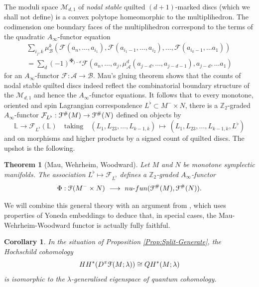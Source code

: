 \documentclass[reqno,10pt]{amsart}
\numberwithin{equation}{section}
\newcommand{\bL}{{\mathbb L}}
\newcommand{\bZ}{{\mathbb Z}}
\newcommand{\scrF}{\EuScript{F}}
\newcommand{\cF}{{\mathcal F}}
\newcommand{\sA}{{\mathscr A}}
\newcommand{\sB}{{\mathscr B}}
\newtheorem{Theorem}[thm]{Theorem}
\newtheorem{Corollary}[thm]{Corollary}
\theoremstyle{remark}
\begin{document}
The moduli space $\mathcal{M}_{d,1}$ of \emph{nodal stable} quilted $(d+1)$-marked discs  (which we shall not define) is a convex polytope homeomorphic to the multiplihedron.  The codimension one boundary faces of the multiplihedron correspond to the terms of the quadratic $A_{\infty}$-functor equation
\begin{multline*}
\sum_{i_j, k} \mu_{\sB}^k(\cF(a_n,\ldots,a_{i_1}),\cF(a_{i_1-1},\ldots, a_{i_2}), \ldots, \cF(a_{i_k-1},\ldots a_1)) \\
= \sum_d (-1)^{\maltese_{j-d}} \cF(a_n,\ldots, a_{j}, \mu_{\sA}^d (a_{j-d},\ldots, a_{j-d-1}), a_{j-d},\ldots a_1) 
\end{multline*}
for an $A_{\infty}$-functor $\cF: \sA \rightarrow \sB$.  Mau's gluing theorem \cite{Mau} shows that the counts of nodal stable quilted discs indeed reflect the combinatorial boundary structure of the $\mathcal{M}_{d,1}$ and hence the $A_{\infty}$-functor equations.  It follows that  to every monotone, oriented and spin Lagrangian correspondence $L^{\flat} \subset M^-\times N$, there is a $\bZ_2$-graded $A_{\infty}$-functor $\cF_{L^{\flat}}: \scrF^{\#}(M) \rightarrow \scrF^{\#}(N)$ defined on objects by
\[
\bL \longrightarrow  \cF_{L^{\flat}}(\bL) \quad \textrm{taking} \quad 
(L_1, L_{23}, \ldots, L_{k-1,k}) \,   \mapsto \,  (L_1,L_{23},\ldots, L_{k-1,k},L^{\flat})
\]
and on morphisms and higher products by a signed count of quilted discs. 
The upshot is the following.  

\begin{Theorem}[Mau, Wehrheim, Woodward] \label{Thm:QuiltsGiveFunctors} 
Let $M$ and $N$ be monotone symplectic manifolds.  The association $L^{\flat} \mapsto \cF_{L^{\flat}}$ defines a $\bZ_2$-graded $A_{\infty}$-functor
\[
\Phi: \scrF(M^- \times N) \ \longrightarrow \ nu\mbox{-}fun(\scrF^{\#}(M),\scrF^{\#}(N)).
\]
\end{Theorem}

We will combine this general theory with an argument from \cite{Abouzaid-Smith}, which uses properties of Yoneda embeddings to deduce that, in special cases, the Mau-Wehrheim-Woodward functor is actually fully faithful.


\begin{Corollary}\label{Cor:QuiltsQH}
In the situation of Proposition \ref{Prop:Split-Generate}, the Hochschild cohomology
\[
HH^*(D^{\pi}\scrF(M;\lambda)) \cong QH^*(M;\lambda)
\]
is isomorphic to the $\lambda$-generalised eigenspace of quantum cohomology.
\end{Corollary}
\end{document}
